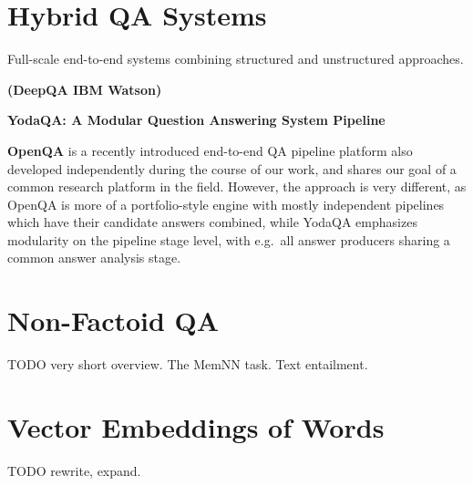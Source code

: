 \section{Hybrid QA Systems}

Full-scale end-to-end systems combining structured and unstructured approaches.

\textbf{(DeepQA IBM Watson)} \citep{WatsonOverview}

\textbf{YodaQA: A Modular Question Answering System Pipeline} \citep{YodaQAPoster2015}

\textbf{OpenQA} \citep{OpenQA} is a recently introduced end-to-end QA pipeline platform
also developed independently during the course of our work, and shares our
goal of a common research platform in the field.  However, the approach
is very different, as OpenQA is more of a portfolio-style engine with
mostly independent pipelines which have their candidate answers combined,
while YodaQA emphasizes modularity on the pipeline stage level,
with e.g.\ all answer producers sharing a common answer analysis stage.





\section{Non-Factoid QA}
\label{sec:nonfactoid}

TODO very short overview.  The MemNN task.  Text entailment.





\section{Vector Embeddings of Words}
\label{sec:embeddings}

TODO rewrite, expand.

